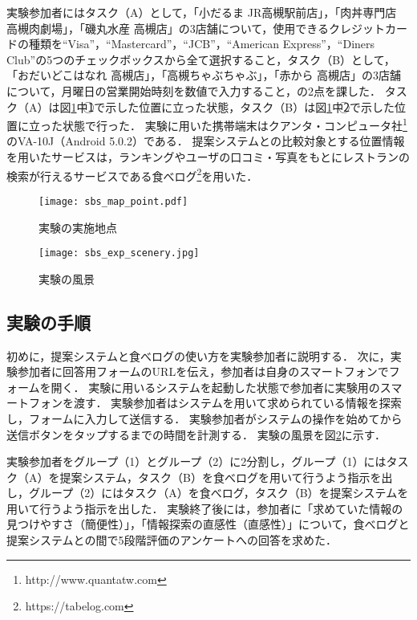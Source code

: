     実験参加者にはタスク（A）として，「小だるま JR高槻駅前店」，「肉丼専門店 高槻肉劇場」，「磯丸水産 高槻店」の3店舗について，使用できるクレジットカードの種類を``Visa''，``Mastercard''，``JCB''，``American Express''，``Diners Club''の5つのチェックボックスから全て選択すること，タスク（B）として，「おだいどこはなれ 高槻店」，「高槻ちゃぶちゃぶ」，「赤から 高槻店」の3店舗について，月曜日の営業開始時刻を数値で入力すること，の2点を課した．
    タスク（A）は図\ref{figure:exp_sbs_point}中\textcircled{\scriptsize 1}で示した位置に立った状態，タスク（B）は図\ref{figure:exp_sbs_point}中\textcircled{\scriptsize 2}で示した位置に立った状態で行った．
    実験に用いた携帯端末はクアンタ・コンピュータ社\footnote{http://www.quantatw.com}のVA-10J（Android 5.0.2）である．
    提案システムとの比較対象とする位置情報を用いたサービスは，ランキングやユーザの口コミ・写真をもとにレストランの検索が行えるサービスである食べログ\footnote{https://tabelog.com}を用いた．

  \begin{figure}[tb]
    \begin{center}
      \texttt{[image: sbs\_map\_point.pdf]}
      \caption{実験の実施地点}
      \label{figure:exp_sbs_point}
    \end{center}
  \end{figure}

  \begin{figure}[tb]
    \centerline{\texttt{[image: sbs\_exp\_scenery.jpg]}}
    \caption{実験の風景}
    \label{figure:exp_sbs_scenery}
  \end{figure}

  \subsection{実験の手順}
    初めに，提案システムと食べログの使い方を実験参加者に説明する．
    次に，実験参加者に回答用フォームのURLを伝え，参加者は自身のスマートフォンでフォームを開く．
    実験に用いるシステムを起動した状態で参加者に実験用のスマートフォンを渡す．
    実験参加者はシステムを用いて求められている情報を探索し，フォームに入力して送信する．
    実験参加者がシステムの操作を始めてから送信ボタンをタップするまでの時間を計測する．
    実験の風景を図\ref{figure:exp_sbs_scenery}に示す．

    実験参加者をグループ（1）とグループ（2）に2分割し，グループ（1）にはタスク（A）を提案システム，タスク（B）を食べログを用いて行うよう指示を出し，グループ（2）にはタスク（A）を食べログ，タスク（B）を提案システムを用いて行うよう指示を出した．
    実験終了後には，参加者に「求めていた情報の見つけやすさ（簡便性）」，「情報探索の直感性（直感性）」について，食べログと提案システムとの間で5段階評価のアンケートへの回答を求めた．

